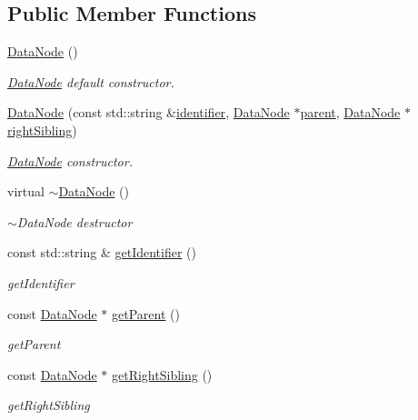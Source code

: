 \subsection*{Public Member Functions}
\begin{DoxyCompactItemize}
\item 
\hyperlink{classDatabase_1_1DataNode_a7999f782bb0465613e703364db8cd22a}{Data\+Node} ()\hypertarget{classDatabase_1_1DataNode_a7999f782bb0465613e703364db8cd22a}{}\label{classDatabase_1_1DataNode_a7999f782bb0465613e703364db8cd22a}

\begin{DoxyCompactList}\small\item\em \hyperlink{classDatabase_1_1DataNode}{Data\+Node} default constructor. \end{DoxyCompactList}\item 
\hyperlink{classDatabase_1_1DataNode_ac7680a07b6a02dbc031bdd338b36aa1d}{Data\+Node} (const std\+::string \&\hyperlink{classDatabase_1_1DataNode_ace59a7fba9c490d2dae59c4af7b0c71f}{identifier}, \hyperlink{classDatabase_1_1DataNode}{Data\+Node} $\ast$\hyperlink{classDatabase_1_1DataNode_a8d70472d0f14aa3ae3ee74d9f3e879d6}{parent}, \hyperlink{classDatabase_1_1DataNode}{Data\+Node} $\ast$\hyperlink{classDatabase_1_1DataNode_ae335fc33c3813e8a6638d50faef44d5d}{right\+Sibling})
\begin{DoxyCompactList}\small\item\em \hyperlink{classDatabase_1_1DataNode}{Data\+Node} constructor. \end{DoxyCompactList}\item 
virtual \hyperlink{classDatabase_1_1DataNode_ac58f04cb07497c0b0028398f18f36c4f}{$\sim$\+Data\+Node} ()\hypertarget{classDatabase_1_1DataNode_ac58f04cb07497c0b0028398f18f36c4f}{}\label{classDatabase_1_1DataNode_ac58f04cb07497c0b0028398f18f36c4f}

\begin{DoxyCompactList}\small\item\em $\sim$\+Data\+Node destructor \end{DoxyCompactList}\item 
const std\+::string \& \hyperlink{classDatabase_1_1DataNode_a428c4442fbdb48945dbd432c1f03ab60}{get\+Identifier} ()
\begin{DoxyCompactList}\small\item\em get\+Identifier \end{DoxyCompactList}\item 
const \hyperlink{classDatabase_1_1DataNode}{Data\+Node} $\ast$ \hyperlink{classDatabase_1_1DataNode_a888e0c17ef05ffbf2e332e15c7636209}{get\+Parent} ()
\begin{DoxyCompactList}\small\item\em get\+Parent \end{DoxyCompactList}\item 
const \hyperlink{classDatabase_1_1DataNode}{Data\+Node} $\ast$ \hyperlink{classDatabase_1_1DataNode_a09d6674f389f8d528cea37326cfe9037}{get\+Right\+Sibling} ()
\begin{DoxyCompactList}\small\item\em get\+Right\+Sibling \end{DoxyCompactList}\end{DoxyCompactItemize}
